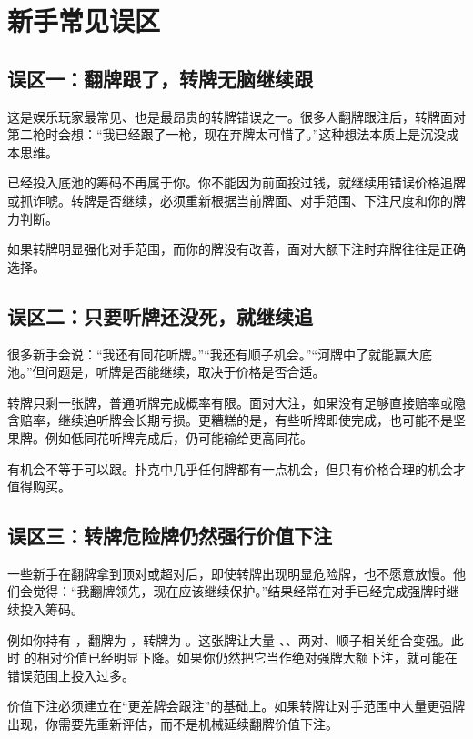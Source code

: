 \section{新手常见误区}

\subsection{误区一：翻牌跟了，转牌无脑继续跟}

这是娱乐玩家最常见、也是最昂贵的转牌错误之一。很多人翻牌跟注后，转牌面对第二枪时会想：“我已经跟了一枪，现在弃牌太可惜了。”这种想法本质上是沉没成本思维。

已经投入底池的筹码不再属于你。你不能因为前面投过钱，就继续用错误价格追牌或抓诈唬。转牌是否继续，必须重新根据当前牌面、对手范围、下注尺度和你的牌力判断。

如果转牌明显强化对手范围，而你的牌没有改善，面对大额下注时弃牌往往是正确选择。

\subsection{误区二：只要听牌还没死，就继续追}

很多新手会说：“我还有同花听牌。”“我还有顺子机会。”“河牌中了就能赢大底池。”但问题是，听牌是否能继续，取决于价格是否合适。

转牌只剩一张牌，普通听牌完成概率有限。面对大注，如果没有足够直接赔率或隐含赔率，继续追听牌会长期亏损。更糟糕的是，有些听牌即使完成，也可能不是坚果牌。例如低同花听牌完成后，仍可能输给更高同花。

有机会不等于可以跟。扑克中几乎任何牌都有一点机会，但只有价格合理的机会才值得购买。

\subsection{误区三：转牌危险牌仍然强行价值下注}

一些新手在翻牌拿到顶对或超对后，即使转牌出现明显危险牌，也不愿意放慢。他们会觉得：“我翻牌领先，现在应该继续保护。”结果经常在对手已经完成强牌时继续投入筹码。

例如你持有 ，翻牌为 ，转牌为 。这张牌让大量 、、两对、顺子相关组合变强。此时  的相对价值已经明显下降。如果你仍然把它当作绝对强牌大额下注，就可能在错误范围上投入过多。

价值下注必须建立在“更差牌会跟注”的基础上。如果转牌让对手范围中大量更强牌出现，你需要先重新评估，而不是机械延续翻牌价值下注。

